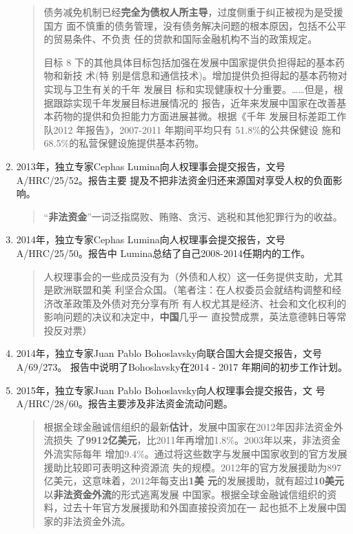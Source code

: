 \begin{enumerate}
\begin{quotation}
     债务减免机制已经\textbf{完全为债权人所主导}，过度侧重于纠正被视为是受援国方
     面不慎重的债务管理，没有债务解决问题的根本原因，包括不公平的贸易条件、不负责
     任的贷款和国际金融机构不当的政策规定。

     目标 8 下的其他具体目标包括加强在发展中国家提供负担得起的基本药物和新技
     术(特 别是信息和通信技术)。增加提供负担得起的基本药物对实现与卫生有关的千年
     发展目 标和实现健康权十分重要。……但是，根据跟踪实现千年发展目标进展情况的
     报告，近年来发展中国家在改善基本药物的提供和负担能力方面进展甚微。根据《千年
     发展目标差距工作队2012 年报告》，2007-2011 年期间平均只有 51.8\%的公共保健设
     施和 68.5\%的私营保健设施提供基本药物。
   \end{quotation}

\item 2013年，独立专家Cephas Lumina向人权理事会提交报告，文号A/HRC/25/52。报告主要
  提及不把非法资金归还来源国对享受人权的负面影响。
  \begin{quotation}
    “\textbf{非法资金}”一词泛指腐败、贿赂、贪污、逃税和其他犯罪行为的收益。
  \end{quotation}
  
\item 2014年，独立专家Cephas Lumina向人权理事会提交报告，文号A/HRC/25/50。报告中
  Lumina总结了自己2008-2014任期内的工作。
  \begin{quotation}
    人权理事会的一些成员没有为（外债和人权）这一任务提供支助，尤其是欧洲联盟和美
    利坚合众国。（笔者注：在人权委员会就结构调整和经济改革政策及外债对充分享有所
    有人权尤其是经济、社会和文化权利的影响问题的决议和决定中，\textbf{中国}几乎一
    直投赞成票，英法意德韩日等常投反对票）
  \end{quotation}

\item 2014年，独立专家Juan Pablo Bohoslavsky向联合国大会提交报告，文号A/69/273。
  报告中说明了Bohoslavsky在2014 - 2017 年期间的初步工作计划。
  
\item 2015年，独立专家Juan Pablo Bohoslavsky向人权理事会提交报告，文
  号A/HRC/28/60。报告主要涉及非法资金流动问题。
  \begin{quotation}
    根据全球金融诚信组织的最新\textbf{估计}，发展中国家在2012年因非法资金外流损失
    了\textbf{9912亿美元}，比2011年再增加1.8\%。2003年以来，非法资金外流实际每年
    增加9.4\%。通过将这些数字与发展中国家收到的官方发展援助比较即可表明这种资源流
    失的规模。2012年的官方发展援助为897亿美元，这意味着，2012年每支出\textbf{1美
      元}的发展援助，就有超过\textbf{10美元}以\textbf{非法资金外流}的形式逃离发展
    中国家。根据全球金融诚信组织的资料，过去十年官方发展援助和外国直接投资加在一
    起也抵不上发展中国家的非法资金外流。


\end{quotation}
\end{enumerate}
